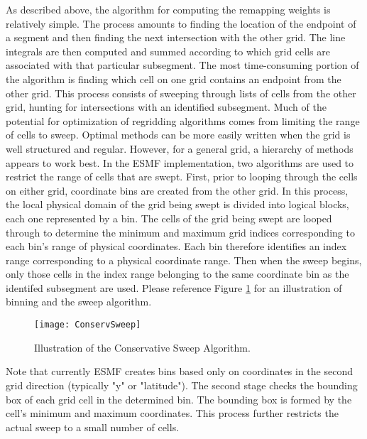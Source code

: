      As described above, the algorithm for computing the remapping weights
     is relatively simple.  The process amounts to finding the location of
     the endpoint of a segment and then finding the next intersection with
     the other grid.  The line integrals are then computed and summed according
     to which grid cells are associated with that particular subsegment.  The
     most time-consuming portion of the algorithm is finding which cell on one
     grid contains an endpoint from the other grid.  This process consists
     of sweeping through lists of cells from the other grid, hunting for
     intersections with an identified subsegment.   Much of the potential for
     optimization of regridding algorithms comes from limiting the range of
     cells to sweep.  Optimal methods can be more easily written when the grid
     is well structured and regular.  However, for a general grid, a hierarchy
     of methods appears to work best.  In the ESMF
     implementation, two algorithms are used to restrict the range of cells
     that are swept.  First, prior to looping through the cells on either grid,
     coordinate bins are created from the other grid.  In this process, the local
     physical domain of the grid being swept is divided into logical blocks, each
     one represented by a bin.  The cells of the grid being swept are looped through
     to determine the minimum and maximum grid indices corresponding to each bin's
     range of physical coordinates.  Each bin therefore identifies an index range
     corresponding to a physical coordinate range.  Then when the sweep begins,
     only those cells in the index range belonging to the same coordinate bin as
     the identifed subsegment are used.  Please reference Figure 
     \ref{fig:ConservSweep} for an illustration of binning and the sweep
     algorithm.

\begin{center}
\begin{figure}
\caption{Illustration of the Conservative Sweep Algorithm. }
\label{fig:ConservSweep}
\texttt{[image: ConservSweep]}
\end{figure}
\end{center}

     Note that currently ESMF creates bins based
     only on coordinates in the second grid direction (typically "y" or "latitude").
     The second stage checks the bounding box of each grid cell in the determined
     bin.  The bounding box is formed by the cell's minimum and maximum coordinates.
     This process further restricts the actual sweep to a small number of cells.

